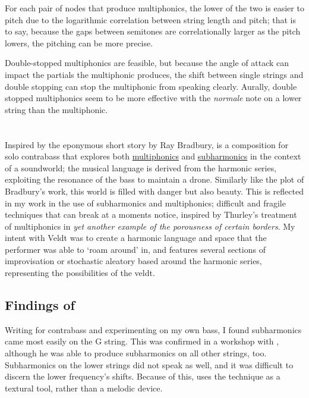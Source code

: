 For each pair of nodes that produce multiphonics, the lower of the two is easier to pitch due to the logarithmic correlation between string length and pitch;
that is to say, because the gaps between semitones are correlationally larger as the pitch lowers, the pitching can be more precise.

Double-stopped multiphonics are feasible, but because the angle of attack can impact the partials the multiphonic produces, the shift between single strings and double stopping can stop the multiphonic from speaking clearly.\autocite[]{smithFeedbackCelloSightreading2019}
Aurally, double stopped multiphonics seem to be more effective with the \emph{normale} note on a lower string than the multiphonic.



\section{\bassPiece}\label{sec:bassPiece}
Inspired by the eponymous short story by Ray Bradbury, \hyperref[app:bassPiece Score]{\bassPiece} is a composition for solo contrabass that explores both \hyperref[sec:multiphonicsDiscussion]{multiphonics} and \hyperref[sec:subharmonicsDiscussion]{subharmonics} in the context of a soundworld; the musical language is derived from the harmonic series, exploiting the resonance of the bass to maintain a drone.\autocite[]{bradburyVeldt1951}
Similarly like the plot of Bradbury's work, this world is filled with danger but also beauty. 
This is reflected in my work in the use of subharmonics and multiphonics; difficult and fragile techniques that can break at a moments notice, inspired by Thurley's treatment of multiphonics in \emph{yet another example of the porousness of certain borders}.\autocite[]{thurleyAnotherExamplePorousness2014}
My intent with Veldt was to create a harmonic language and space that the performer was able to `roam around' in, and features several sections of improvisation or stochastic aleatory based around the harmonic series, representing the possibilities of the veldt.

\subsection{Findings of \bassPiece}
Writing for contrabass and experimenting on my own bass, I found subharmonics came most easily on the G string. 
This was confirmed in a workshop with \bassParticipant, although he was able to produce subharmonics on all other strings, too.
Subharmonics on the lower strings did not speak as well, and it was difficult to discern the lower frequency's shifts.
Because of this, \bassPiece\space uses the technique as a textural tool, rather than a melodic device.

